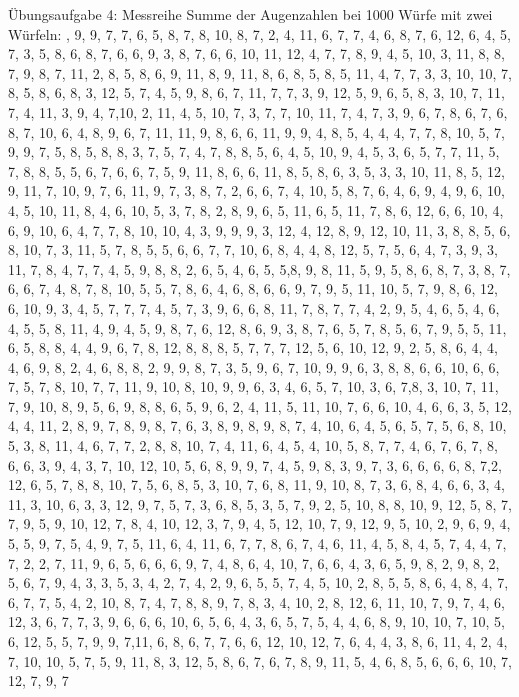 \documentclass[fleqn,a4paper,12pt]{article}
\begin{document}
Übungsaufgabe 4: \newline
Messreihe Summe der Augenzahlen bei 1000 Würfe mit zwei Würfeln: , 9, 9, 7, 7, 6, 5, 8, 7, 8, 10, 8, 7, 2, 4, 11, 6, 7, 7, 4, 6, 8, 7, 6, 12, 6, 4, 5, 7, 3, 5, 8, 6, 8, 7, 6, 6, 9, 3, 8, 7, 6, 6, 10, 11, 12, 4, 7, 7, 8, 9, 4, 5, 10, 3, 11, 8, 8, 7, 9, 8, 7, 11, 2, 8, 5, 8, 6, 9, 11, 8, 9, 11, 8, 6, 8, 5, 8, 5, 11, 4, 7, 7, 3, 3, 10, 10, 7, 8, 5, 8, 6, 8, 3, 12, 5, 7, 4, 5, 9, 8, 6, 7, 11, 7, 7, 3, 9, 12, 5, 9, 6, 5, 8, 3, 10, 7, 11, 7, 4, 11, 3, 9, 4, 7,10, 2, 11, 4, 5, 10, 7, 3, 7, 7, 10, 11, 7, 4, 7, 3, 9, 6, 7, 8, 6, 7, 6, 8, 7, 10, 6, 4, 8, 9, 6, 7, 11, 11, 9, 8, 6, 6, 11, 9, 9, 4, 8, 5, 4, 4, 4, 7, 7, 8, 10, 5, 7, 9, 9, 7, 5, 8, 5, 8, 8, 3, 7, 5, 7, 4, 7, 8, 8, 5, 6, 4, 5, 10, 9, 4, 5, 3, 6, 5, 7, 7, 11, 5, 7, 8, 8, 5, 5, 6, 7, 6, 6, 7, 5, 9, 11, 8, 6, 6, 11, 8, 5, 8, 6, 3, 5, 3, 3, 10, 11, 8, 5, 12, 9, 11, 7, 10, 9, 7, 6, 11, 9, 7, 3, 8, 7, 2, 6, 6, 7, 4, 10, 5, 8, 7, 6, 4, 6, 9, 4, 9, 6, 10, 4, 5, 10, 11, 8, 4, 6, 10, 5, 3, 7, 8, 2, 8, 9, 6, 5, 11, 6, 5, 11, 7, 8, 6, 12, 6, 6, 10, 4, 6, 9, 10, 6, 4, 7, 7, 8, 10, 10, 4, 3, 9, 9, 9, 3, 12, 4, 12, 8, 9, 12, 10, 11, 3, 8, 8, 5, 6, 8, 10, 7, 3, 11, 5, 7, 8, 5, 5, 6, 6, 7, 7, 10, 6, 8, 4, 4, 8, 12, 5, 7, 5, 6, 4, 7, 3, 9, 3, 11, 7, 8, 4, 7, 7, 4, 5, 9, 8, 8, 2, 6, 5, 4, 6, 5, 5,8, 9, 8, 11, 5, 9, 5, 8, 6, 8, 7, 3, 8, 7, 6, 6, 7, 4, 8, 7, 8, 10, 5, 5, 7, 8, 6, 4, 6, 8, 6, 6, 9, 7, 9, 5, 11, 10, 5, 7, 9, 8, 6, 12, 6, 10, 9, 3, 4, 5, 7, 7, 7, 4, 5, 7, 3, 9, 6, 6, 8, 11, 7, 8, 7, 7, 4, 2, 9, 5, 4, 6, 5, 4, 6, 4, 5, 5, 8, 11, 4, 9, 4, 5, 9, 8, 7, 6, 12, 8, 6, 9, 3, 8, 7, 6, 5, 7, 8, 5, 6, 7, 9, 5, 5, 11, 6, 5, 8, 8, 4, 4, 9, 6, 7, 8, 12, 8, 8, 8, 5, 7, 7, 7, 12, 5, 6, 10, 12, 9, 2, 5, 8, 6, 4, 4, 4, 6, 9, 8, 2, 4, 6, 8, 8, 2, 9, 9, 8, 7, 3, 5, 9, 6, 7, 10, 9, 9, 6, 3, 8, 8, 6, 6, 10, 6, 6, 7, 5, 7, 8, 10, 7, 7, 11, 9, 10, 8, 10, 9, 9, 6, 3, 4, 6, 5, 7, 10, 3, 6, 7,8, 3, 10, 7, 11, 7, 9, 10, 8, 9, 5, 6, 9, 8, 8, 6, 5, 9, 6, 2, 4, 11, 5, 11, 10, 7, 6, 6, 10, 4, 6, 6, 3, 5, 12, 4, 4, 11, 2, 8, 9, 7, 8, 9, 8, 7, 6, 3, 8, 9, 8, 9, 8, 7, 4, 10, 6, 4, 5, 6, 5, 7, 5, 6, 8, 10, 5, 3, 8, 11, 4, 6, 7, 7, 2, 8, 8, 10, 7, 4, 11, 6, 4, 5, 4, 10, 5, 8, 7, 7, 4, 6, 7, 6, 7, 8, 6, 6, 3, 9, 4, 3, 7, 10, 12, 10, 5, 6, 8, 9, 9, 7, 4, 5, 9, 8, 3, 9, 7, 3, 6, 6, 6, 6, 8, 7,2, 12, 6, 5, 7, 8, 8, 10, 7, 5, 6, 8, 5, 3, 10, 7, 6, 8, 11, 9, 10, 8, 7, 3, 6, 8, 4, 6, 6, 3, 4, 11, 3, 10, 6, 3, 3, 12, 9, 7, 5, 7, 3, 6, 8, 5, 3, 5, 7, 9, 2, 5, 10, 8, 8, 10, 9, 12, 5, 8, 7, 7, 9, 5, 9, 10, 12, 7, 8, 4, 10, 12, 3, 7, 9, 4, 5, 12, 10, 7, 9, 12, 9, 5, 10, 2, 9, 6, 9, 4, 5, 5, 9, 7, 5, 4, 9, 7, 5, 11, 6, 4, 11, 6, 7, 7, 8, 6, 7, 4, 6, 11, 4, 5, 8, 4, 5, 7, 4, 4, 7, 7, 2, 2, 7, 11, 9, 6, 5, 6, 6, 6, 9, 7, 4, 8, 6, 4, 10, 7, 6, 6, 4, 3, 6, 5, 9, 8, 2, 9, 8, 2, 5, 6, 7, 9, 4, 3, 3, 5, 3, 4, 2, 7, 4, 2, 9, 6, 5, 5, 7, 4, 5, 10, 2, 8, 5, 5, 8, 6, 4, 8, 4, 7, 6, 7, 7, 5, 4, 2, 10, 8, 7, 4, 7, 8, 8, 9, 7, 8, 3, 4, 10, 2, 8, 12, 6, 11, 10, 7, 9, 7, 4, 6, 12, 3, 6, 7, 7, 3, 9, 6, 6, 6, 10, 6, 5, 6, 4, 3, 6, 5, 7, 5, 4, 4, 6, 8, 9, 10, 10, 7, 10, 5, 6, 12, 5, 5, 7, 9, 9, 7,11, 6, 8, 6, 7, 7, 6, 6, 12, 10, 12, 7, 6, 4, 4, 3, 8, 6, 11, 4, 2, 4, 7, 10, 10, 5, 7, 5, 9, 11, 8, 3, 12, 5, 8, 6, 7, 6, 7, 8, 9, 11, 5, 4, 6, 8, 5, 6, 6, 6, 10, 7, 12, 7, 9, 7 \newline
\end{document}
